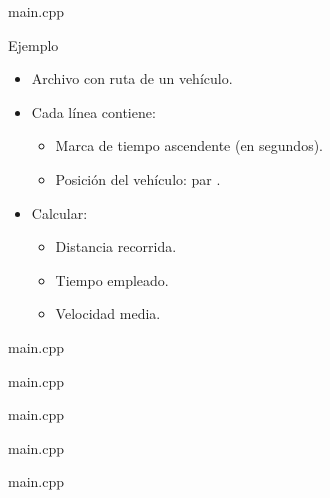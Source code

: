  {
\begin{frame}
\begin{block}{main.cpp}

\end{block}
\end{frame}
}

\begin{frame}{Ejemplo}
\begin{itemize}
  \item Archivo con ruta de un vehículo.
  \item Cada línea contiene:
     \begin{itemize}
       \item Marca de tiempo ascendente (en segundos).
       \item Posición del vehículo: par .
     \end{itemize}
  \item Calcular:
    \begin{itemize}
      \item Distancia recorrida.
      \item Tiempo empleado.
      \item Velocidad media.
    \end{itemize}
\end{itemize}
\end{frame}

 {

\begin{frame}
\begin{block}{main.cpp}

\end{block}
\end{frame}

\begin{frame}
\begin{block}{main.cpp}

\end{block}
\end{frame}

\begin{frame}
\begin{block}{main.cpp}

\end{block}
\end{frame}

\begin{frame}
\begin{block}{main.cpp}

\end{block}
\end{frame}

}

 {
\begin{frame}
\begin{block}{main.cpp}

\end{block}
\end{frame}
}
